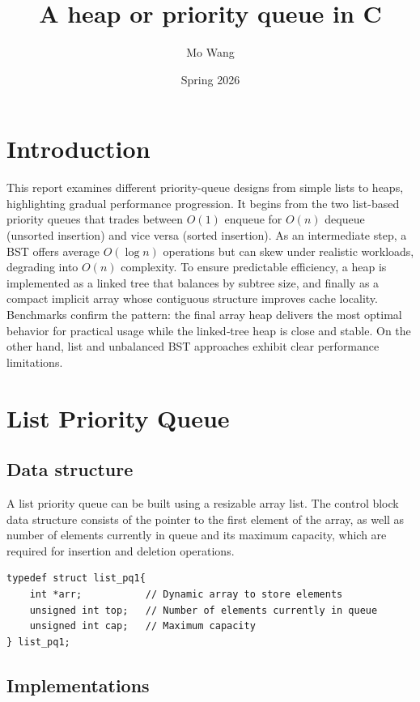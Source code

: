 \documentclass[a4paper,11pt]{article}
\begin{document}
\title{
    \textbf{A heap or priority queue in C}
}
\author{Mo Wang}
\date{Spring 2026}

\maketitle

\section*{Introduction}
This report examines different priority-queue designs from simple lists to heaps, highlighting gradual performance progression. It begins from the two list-based priority queues that trades between $O(1)$ enqueue for $O(n)$ dequeue (unsorted insertion) and vice versa (sorted insertion). As an intermediate step, a BST offers average $O(\log n)$ operations but can skew under realistic workloads, degrading into $O(n)$ complexity. To ensure predictable efficiency, a heap is implemented as a linked tree that balances by subtree size, and finally as a compact implicit array whose contiguous structure improves cache locality. Benchmarks confirm the pattern: the final array heap delivers the most optimal behavior for practical usage while the linked‑tree heap is close and stable. On the other hand, list and unbalanced BST approaches exhibit clear performance limitations.

\section*{List Priority Queue}
\subsection*{Data structure}

A list priority queue can be built using a resizable array list. The control block data structure consists of the pointer to the first element of the array, as well as number of elements currently in queue and its maximum capacity, which are required for insertion and deletion operations.

\begin{verbatim}
typedef struct list_pq1{
    int *arr;           // Dynamic array to store elements
    unsigned int top;   // Number of elements currently in queue
    unsigned int cap;   // Maximum capacity
} list_pq1;
\end{verbatim}

\subsection*{Implementations}
\end{document}
